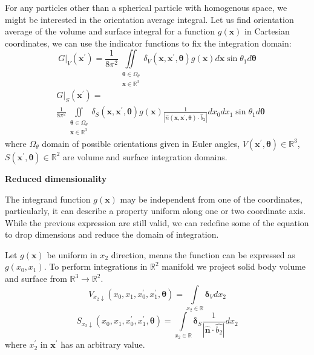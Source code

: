\documentclass[10pt, a4paper]{article}
\begin{document}
\begin{multicols}{2}
For any particles other than a spherical particle with homogenous space, we might be interested in the orientation average integral.
Let us find orientation average of the volume and surface integral for a function $g(\bm{x})$ in Cartesian coordinates, we can use the indicator functions to fix the integration domain:
\begin{equation}\label{eq:vol_int_cartesian}
    \left.G\right|_V (\bm{x}^{\prime}) = \frac{1}{8\pi^2} \iint 
        \limits_{\substack{\bm{\theta} \in \Omega_{\theta} \\
                            \bm{x} \in \mathbb{R}^3}} 
        \delta_V(\bm{x}, \bm{x}^{\prime}, \bm{\theta}) g(\bm{x}) d \bm{x}  \sin \theta_1d \bm{\theta}
\end{equation}
\begin{equation}\label{eq:sur_int_cartesian}
    \begin{aligned}
    &\left.G\right|_S (\bm{x}^{\prime}) = \\ & \frac{1}{8\pi^2} \iint 
    \limits_{\substack{
        \bm{\theta} \in \Omega_{\theta} \\
        \bm{x} \in \mathbb{R}^3}}
        \delta_S(\bm{x}, \bm{x}^{\prime}, \bm{\theta}) g(\bm{x}) 
        \frac{1}{\left|\hat{n}(\bm{x}, \bm{x}^{\prime}, \bm{\theta}) \cdot \hat{b}_2\right|}  dx_0 dx_1  \sin \theta_1 d \bm{\theta}
    \end{aligned}
\end{equation}
where $\Omega_{\theta}$ domain of possible orientations given in Euler angles, $V(\bm{x}^{\prime}, \bm{\theta}) \in \mathbb{R}^3$, $S(\bm{x}^{\prime}, \bm{\theta}) \in \mathbb{R}^2$ are volume and surface integration domains.

\textbf{Reduced dimensionality}

The integrand function $g(\bm{x})$ may be independent from one of the coordinates, particularly, it can describe a property uniform along one or two coordinate axis.
While the previous expression are still valid, we can redefine some of the equation to drop dimensions and reduce the domain of integration.


Let $g(\bm{x})$ be uniform in $x_2$ direction, means the function can be expressed as $g(x_0, x_1)$.
To perform integrations in $\mathbb{R}^2$ manifold we project solid body volume and surface from $\mathbb{R}^3 \to \mathbb{R}^2$.
\begin{equation}\label{eq:x2_down}
        V_{x_2 \downarrow}(x_0, x_1, x^{\prime}_0, x^{\prime}_1, \bm{\theta}) = 
        \int \limits_{x_2 \in \mathbb{R}}
        \bm{\delta}_V dx_2
\end{equation}
\begin{equation}
        S_{x_2 \downarrow}(x_0, x_1, x^{\prime}_0, x^{\prime}_1, \bm{\theta}) = 
        \int \limits_{x_2 \in \mathbb{R}}
        \bm{\delta}_S
        \frac{1}{|\hat{\bm{n}} \cdot \hat{b_2}|} dx_2
\end{equation}
where $x^{\prime}_2$ in $\bm{x}^{\prime}$ has an arbitrary value.




\end{multicols}
\end{document}
